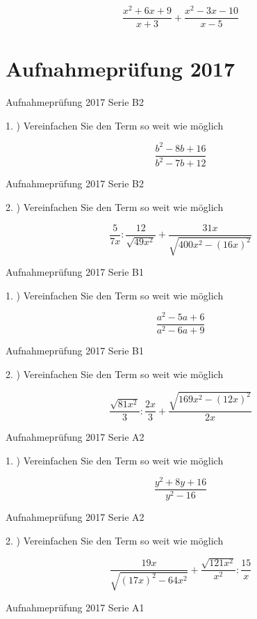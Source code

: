{$$\frac{x^2+6x+9}{x+3} + \frac{x^2-3x-10}{x-5}$$

\section*{Aufnahmeprüfung 2017}
Aufnahmeprüfung 2017 Serie B2

1. ) Vereinfachen Sie den Term so weit wie möglich

$$\frac{b^2-8b+16}{b^2-7b+12}$$

Aufnahmeprüfung 2017 Serie B2

2. ) Vereinfachen Sie den Term so weit wie möglich

$$\frac{5}{7x} : \frac{12}{\sqrt{49x^2}} + \frac{31x}{\sqrt{400x^2 - (16x)^2}}$$

Aufnahmeprüfung 2017 Serie B1

1. ) Vereinfachen Sie den Term so weit wie möglich

$$\frac{a^2-5a+6}{a^2-6a+9}$$

Aufnahmeprüfung 2017 Serie B1

2. ) Vereinfachen Sie den Term so weit wie möglich

$$\frac{\sqrt{81x^2}}{3} : \frac{2x}3 + \frac{\sqrt{169x^2 - (12x)^2}}{2x}$$

Aufnahmeprüfung 2017 Serie A2

1. ) Vereinfachen Sie den Term so weit wie möglich

$$\frac{y^2+8y+16}{y^2-16}$$

Aufnahmeprüfung 2017 Serie A2

2. ) Vereinfachen Sie den Term so weit wie möglich

$$\frac{19x}{\sqrt{(17x)^2 - 64x^2}} + \frac{\sqrt{121x^2}}{x^2} : \frac{15}{x}$$

Aufnahmeprüfung 2017 Serie A1

}
